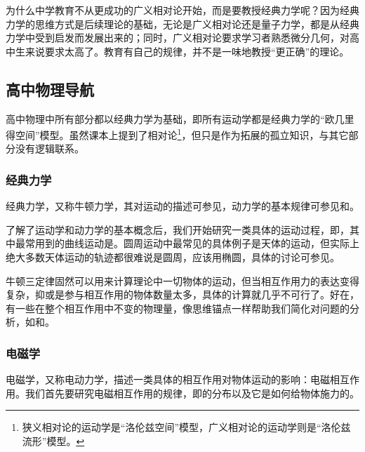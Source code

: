 为什么中学教育不从更成功的广义相对论开始，而是要教授经典力学呢？因为经典力学的思维方式是后续理论的基础，无论是广义相对论还是量子力学，都是从经典力学中受到启发而发展出来的；同时，广义相对论要求学习者熟悉微分几何，对高中生来说要求太高了。教育有自己的规律，并不是一味地教授“更正确”的理论。





\subsection{高中物理导航}


高中物理中所有部分都以经典力学为基础，即所有运动学都是经典力学的“欧几里得空间”模型。虽然课本上提到了相对论\footnote{狭义相对论的运动学是“洛伦兹空间”模型，广义相对论的运动学则是“洛伦兹流形”模型。}，但只是作为拓展的孤立知识，与其它部分没有逻辑联系。




\subsubsection{经典力学}

经典力学，又称牛顿力学，其对运动的描述可参见，动力学的基本规律可参见和。

了解了运动学和动力学的基本概念后，我们开始研究一类具体的运动过程，即，其中最常用到的曲线运动是。圆周运动中最常见的具体例子是天体的运动，但实际上绝大多数天体运动的轨迹都很难说是圆周，应该用椭圆，具体的讨论可参见。


牛顿三定律固然可以用来计算理论中一切物体的运动，但当相互作用力的表达变得复杂，抑或是参与相互作用的物体数量太多，具体的计算就几乎不可行了。好在，有一些在整个相互作用中不变的物理量，像思维锚点一样帮助我们简化对问题的分析，如和。




\subsubsection{电磁学}


电磁学，又称电动力学，描述一类具体的相互作用对物体运动的影响：电磁相互作用。我们首先要研究电磁相互作用的规律，即的分布以及它是如何给物体施力的。
























